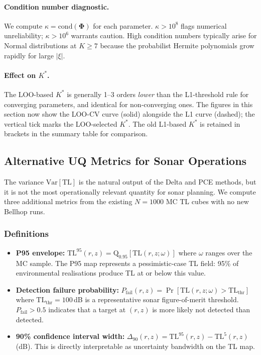 \documentclass[11pt,a4paper]{article}
\newcommand{\Var}{\mathrm{Var}}
\newcommand{\TL}{\mathrm{TL}}
\begin{document}
\paragraph{Condition number diagnostic.}
We compute $\kappa = \mathrm{cond}(\boldsymbol\Phi)$ for each parameter.
$\kappa > 10^8$ flags numerical unreliability; $\kappa > 10^6$ warrants caution.
High condition numbers typically arise for Normal distributions at $K \geq 7$
because the probabilist Hermite polynomials grow rapidly for large
$\lvert\xi\rvert$.

\paragraph{Effect on $K^*$.}
The LOO-based $K^*$ is generally 1--3 orders \emph{lower} than the L1-threshold
rule for converging parameters, and identical for non-converging ones.  The figures
in this section now show the LOO-CV curve (solid) alongside the L1 curve (dashed);
the vertical tick marks the LOO-selected $K^*$.  The old L1-based $K^*$ is retained
in brackets in the summary table for comparison.

\subsection{Alternative UQ Metrics for Sonar Operations}
\label{sec:metrics}

The variance $\Var[\TL]$ is the natural output of the Delta and PCE methods,
but it is not the most operationally relevant quantity for sonar planning.
We compute three additional metrics from the existing $N=1000$ MC TL cubes
with no new Bellhop runs.

\subsubsection{Definitions}

\begin{itemize}
  \item \textbf{P95 envelope:} $\TL^{95}(r,z) = \mathrm{Q}_{0.95}[\TL(r,z;\omega)]$
        where $\omega$ ranges over the MC sample.  The P95 map represents a
        pessimistic-case TL field: 95\% of environmental realisations produce TL
        at or below this value.
  \item \textbf{Detection failure probability:}
        $P_\mathrm{fail}(r,z) = \Pr[\TL(r,z;\omega) > \TL_\mathrm{thr}]$
        where $\TL_\mathrm{thr} = 100$\,dB is a representative sonar figure-of-merit
        threshold.  $P_\mathrm{fail} > 0.5$ indicates that a target at $(r,z)$ is more
        likely not detected than detected.
  \item \textbf{90\% confidence interval width:}
        $\Delta_{90}(r,z) = \TL^{95}(r,z) - \TL^{5}(r,z)$ (dB).
        This is directly interpretable as uncertainty bandwidth on the TL map.
\end{itemize}
\end{document}
